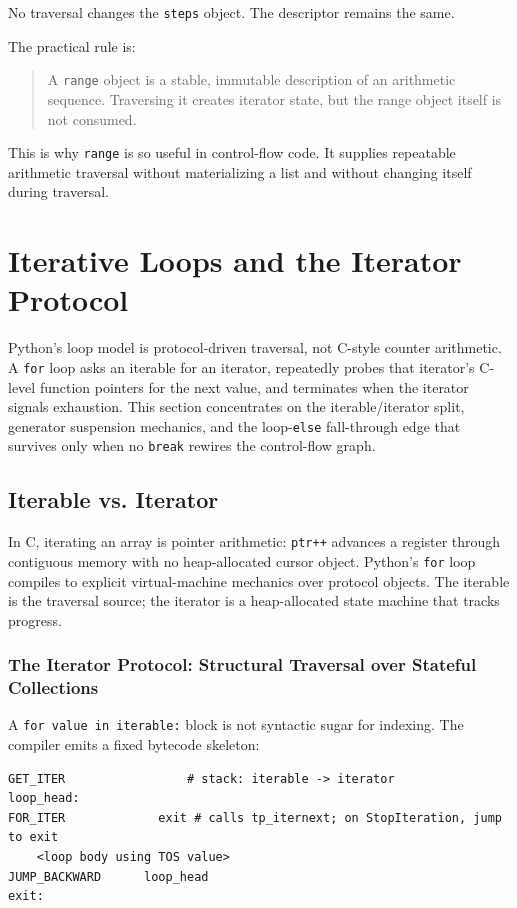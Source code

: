 \documentclass[a4paper,twoside]{report}
\begin{document}
No traversal changes the \texttt{steps} object. The descriptor remains the same.

The practical rule is:

\begin{quote}
A \texttt{range} object is a stable, immutable description of an arithmetic sequence. Traversing it creates iterator state, but the range object itself is not consumed.
\end{quote}

This is why \texttt{range} is so useful in control-flow code. It supplies repeatable arithmetic traversal without materializing a list and without changing itself during traversal.

\section{Iterative Loops and the Iterator Protocol}

Python's loop model is protocol-driven traversal, not C-style counter arithmetic. A \texttt{for} loop asks an iterable for an iterator, repeatedly probes that iterator's C-level function pointers for the next value, and terminates when the iterator signals exhaustion. This section concentrates on the iterable/iterator split, generator suspension mechanics, and the loop-\texttt{else} fall-through edge that survives only when no \texttt{break} rewires the control-flow graph.


\subsection{Iterable vs. Iterator}

In C, iterating an array is pointer arithmetic: \texttt{ptr++} advances a register through contiguous memory with no heap-allocated cursor object. Python's \texttt{for} loop compiles to explicit virtual-machine mechanics over protocol objects. The iterable is the traversal source; the iterator is a heap-allocated state machine that tracks progress.

\subsubsection{The Iterator Protocol: Structural Traversal over Stateful Collections}

A \texttt{for value in iterable:} block is not syntactic sugar for indexing. The compiler emits a fixed bytecode skeleton:

\begin{verbatim}
GET_ITER                 # stack: iterable -> iterator
loop_head:
FOR_ITER             exit # calls tp_iternext; on StopIteration, jump to exit
    <loop body using TOS value>
JUMP_BACKWARD      loop_head
exit:
\end{verbatim}
\end{document}
